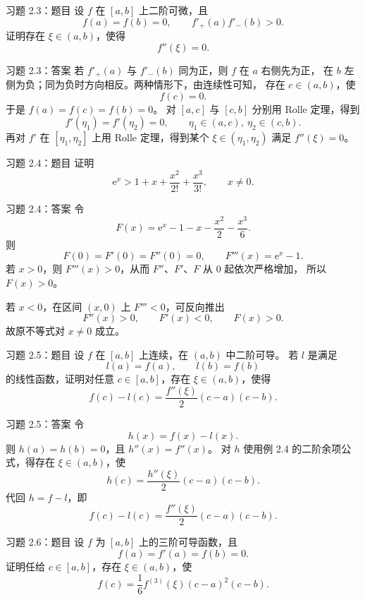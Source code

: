 \documentclass[aspectratio=169,10pt]{ctexbeamer}
\newcommand{\ee}{\mathrm{e}}
\begin{document}
\begin{frame}{习题 2.3：题目}
\small
设 $f$ 在 $[a,b]$ 上二阶可微，且
\[
  f(a)=f(b)=0,\qquad f'_+(a)f'_-(b)>0.
\]
证明存在 $\xi\in(a,b)$，使得
\[
  f''(\xi)=0.
\]
\end{frame}

\begin{frame}{习题 2.3：答案}
\small
若 $f'_+(a)$ 与 $f'_-(b)$ 同为正，则 $f$ 在 $a$ 右侧先为正，
在 $b$ 左侧为负；同为负时方向相反。两种情形下，由连续性可知，
存在 $c\in(a,b)$，使
\[
  f(c)=0.
\]
于是 $f(a)=f(c)=f(b)=0$。
对 $[a,c]$ 与 $[c,b]$ 分别用 Rolle 定理，得到
\[
  f'(\eta_1)=f'(\eta_2)=0,\qquad \eta_1\in(a,c),\ \eta_2\in(c,b).
\]
再对 $f'$ 在 $[\eta_1,\eta_2]$ 上用 Rolle 定理，得到某个
$\xi\in(\eta_1,\eta_2)$ 满足 $f''(\xi)=0$。
\end{frame}

\begin{frame}{习题 2.4：题目}
\small
证明
\[
  \ee^x>1+x+\frac{x^2}{2!}+\frac{x^3}{3!},
  \qquad x\ne0.
\]
\end{frame}

\begin{frame}{习题 2.4：答案}
\small
令
\[
  F(x)=\ee^x-1-x-\frac{x^2}{2}-\frac{x^3}{6}.
\]
则
\[
  F(0)=F'(0)=F''(0)=0,\qquad F'''(x)=\ee^x-1.
\]
若 $x>0$，则 $F'''(x)>0$，从而 $F''$、$F'$、$F$ 从 $0$ 起依次严格增加，
所以 $F(x)>0$。

若 $x<0$，在区间 $(x,0)$ 上 $F'''<0$，可反向推出
\[
  F''(x)>0,\qquad F'(x)<0,\qquad F(x)>0.
\]
故原不等式对 $x\ne0$ 成立。
\end{frame}

\begin{frame}{习题 2.5：题目}
\small
设 $f$ 在 $[a,b]$ 上连续，在 $(a,b)$ 中二阶可导。
若 $l$ 是满足
\[
  l(a)=f(a),\qquad l(b)=f(b)
\]
的线性函数，证明对任意 $c\in[a,b]$，存在 $\xi\in(a,b)$，使得
\[
  f(c)-l(c)=\frac{f''(\xi)}2(c-a)(c-b).
\]
\end{frame}

\begin{frame}{习题 2.5：答案}
\small
令
\[
  h(x)=f(x)-l(x).
\]
则 $h(a)=h(b)=0$，且 $h''(x)=f''(x)$。
对 $h$ 使用例 2.4 的二阶余项公式，得存在 $\xi\in(a,b)$，使
\[
  h(c)=\frac{h''(\xi)}2(c-a)(c-b).
\]
代回 $h=f-l$，即
\[
  f(c)-l(c)=\frac{f''(\xi)}2(c-a)(c-b).
\]
\end{frame}

\begin{frame}{习题 2.6：题目}
\small
设 $f$ 为 $[a,b]$ 上的三阶可导函数，且
\[
  f(a)=f'(a)=f(b)=0.
\]
证明任给 $c\in[a,b]$，存在 $\xi\in(a,b)$，使
\[
  f(c)=\frac16 f^{(3)}(\xi)(c-a)^2(c-b).
\]
\end{frame}
\end{document}
